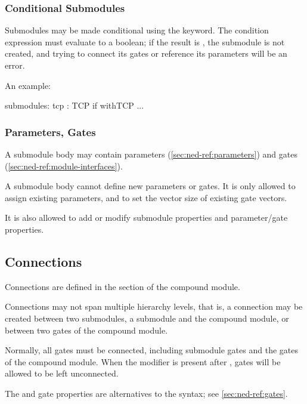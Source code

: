 \subsubsection{Conditional Submodules}
\label{sec:ned-ref:conditional-submodules}

Submodules may be made conditional using the  keyword. The
condition expression must evaluate to a boolean; if the result is
, the submodule is not created, and trying to connect its gates
or reference its parameters will be an error.

An example:

\begin{ned}
submodules:
  tcp : TCP if withTCP { ... }
\end{ned}


\subsubsection{Parameters, Gates}
\label{sec:ned-ref:parameters-gates}

A submodule body may contain parameters (\ref{sec:ned-ref:parameters})
and gates (\ref{sec:ned-ref:module-interfaces}).

A submodule body cannot define new parameters or gates. It is only
allowed to assign existing parameters, and to set the vector
size of existing gate vectors.

It is also allowed to add or modify submodule properties and
parameter/gate properties.



\subsection{Connections}
\label{sec:ned-ref:connections}

Connections are defined in the  section of the compound module.

Connections may not span multiple hierarchy levels, that is, a connection
may be created between two submodules, a submodule and the compound module,
or between two gates of the compound module.

Normally, all gates must be connected, including submodule gates and the gates
of the compound module. When the  modifier is present
after , gates will be allowed to be left unconnected.

\begin{note}
    The  and  gate properties are alternatives to the
     syntax; see \ref{sec:ned-ref:gates}.
\end{note}

